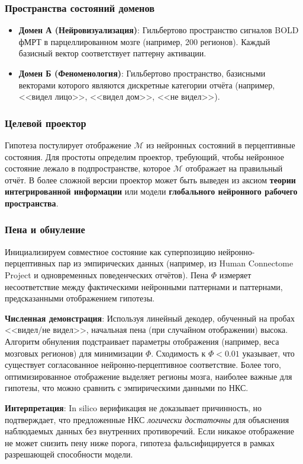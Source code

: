 \documentclass[11pt,a4paper]{article}
\begin{document}
\subsubsection{Пространства состояний доменов}
\begin{itemize}
    \item \textbf{Домен А (Нейровизуализация)}: Гильбертово пространство сигналов BOLD фМРТ в парцеллированном мозге (например, 200 регионов). Каждый базисный вектор соответствует паттерну активации.
    \item \textbf{Домен Б (Феноменология)}: Гильбертово пространство, базисными векторами которого являются дискретные категории отчёта (например, <<видел лицо>>, <<видел дом>>, <<не видел>>).
\end{itemize}

\subsubsection{Целевой проектор}
Гипотеза постулирует отображение \(\mathcal{M}\) из нейронных состояний в перцептивные состояния. Для простоты определим проектор, требующий, чтобы нейронное состояние лежало в подпространстве, которое \(\mathcal{M}\) отображает на правильный отчёт. В более сложной версии проектор может быть выведен из аксиом \textbf{теории интегрированной информации} или модели \textbf{глобального нейронного рабочего пространства}.

\subsubsection{Пена и обнуление}
Инициализируем совместное состояние как суперпозицию нейронно-перцептивных пар из эмпирических данных (например, из Human Connectome Project и одновременных поведенческих отчётов). Пена \(\Phi\) измеряет несоответствие между фактическими нейронными паттернами и паттернами, предсказанными отображением гипотезы.

\textbf{Численная демонстрация}: Используя линейный декодер, обученный на пробах <<видел/не видел>>, начальная пена (при случайном отображении) высока. Алгоритм обнуления подстраивает параметры отображения (например, веса мозговых регионов) для минимизации \(\Phi\). Сходимость к \(\Phi < 0.01\) указывает, что существует согласованное нейронно-перцептивное соответствие. Более того, оптимизированное отображение выделяет регионы мозга, наиболее важные для гипотезы, что можно сравнить с эмпирическими данными по НКС.

\textbf{Интерпретация}: In silico верификация не доказывает причинность, но подтверждает, что предложенные НКС \emph{логически достаточны} для объяснения наблюдаемых данных без внутренних противоречий. Если никакое отображение не может снизить пену ниже порога, гипотеза фальсифицируется в рамках разрешающей способности модели.
\end{document}
